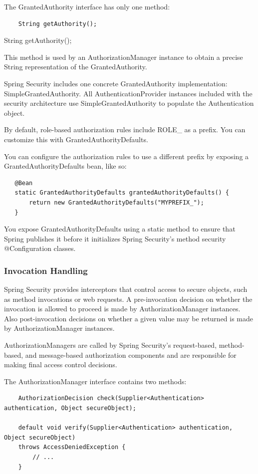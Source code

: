 \documentclass{scrartcl}
\begin{document}
The GrantedAuthority interface has only one method:

\begin{lstlisting}
    String getAuthority();
\end{lstlisting}

String getAuthority();

This method is used by an AuthorizationManager instance to obtain a precise String representation of the GrantedAuthority.

Spring Security includes one concrete GrantedAuthority implementation: SimpleGrantedAuthority. All AuthenticationProvider instances included with the security architecture use SimpleGrantedAuthority to populate the Authentication object.

By default, role-based authorization rules include ROLE\_ as a prefix. You can customize this with GrantedAuthorityDefaults.

You can configure the authorization rules to use a different prefix by exposing a GrantedAuthorityDefaults bean, like so:

\begin{lstlisting}
   @Bean
   static GrantedAuthorityDefaults grantedAuthorityDefaults() {
       return new GrantedAuthorityDefaults("MYPREFIX_");
   }
\end{lstlisting}

You expose GrantedAuthorityDefaults using a static method to ensure that Spring publishes it before it initializes Spring Security’s method security @Configuration classes.

\subsubsection{Invocation Handling}

Spring Security provides interceptors that control access to secure objects, such as method invocations or web requests. A pre-invocation decision on whether the invocation is allowed to proceed is made by AuthorizationManager instances. Also post-invocation decisions on whether a given value may be returned is made by AuthorizationManager instances.

AuthorizationManagers are called by Spring Security’s request-based, method-based, and message-based authorization components and are responsible for making final access control decisions.

The AuthorizationManager interface contains two methods:

\begin{lstlisting}
    AuthorizationDecision check(Supplier<Authentication> authentication, Object secureObject);

    default void verify(Supplier<Authentication> authentication, Object secureObject)
    throws AccessDeniedException {
        // ...
    }
\end{lstlisting}
\end{document}
